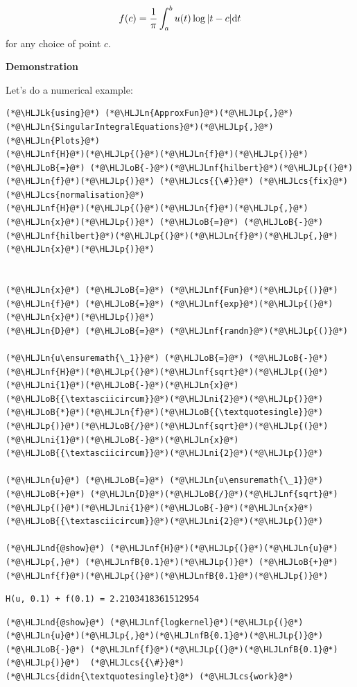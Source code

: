 \documentclass[12pt,a4paper]{article}
\newcommand{\HLJLk}[1]{\textcolor[RGB]{148,91,176}{\textbf{#1}}}
\newcommand{\HLJLn}[1]{#1}
\newcommand{\HLJLnd}[1]{\textcolor[RGB]{214,102,97}{#1}}
\newcommand{\HLJLnf}[1]{\textcolor[RGB]{66,102,213}{#1}}
\newcommand{\HLJLnfB}[1]{\textcolor[RGB]{59,151,46}{#1}}
\newcommand{\HLJLni}[1]{\textcolor[RGB]{59,151,46}{#1}}
\newcommand{\HLJLoB}[1]{\textcolor[RGB]{102,102,102}{\textbf{#1}}}
\newcommand{\HLJLp}[1]{#1}
\newcommand{\HLJLcs}[1]{\textcolor[RGB]{153,153,119}{\textit{#1}}}
\def\D{ {\rm d} }
\def\dt{\D t}
\begin{document}
\[
f(c) = {1 \over \pi} \int_a^b u(t) \log |t-c| \dt
\]
for any choice of point  $c$.

\textbf{Demonstration}

Let's do a numerical example:


\begin{lstlisting}
(*@\HLJLk{using}@*) (*@\HLJLn{ApproxFun}@*)(*@\HLJLp{,}@*) (*@\HLJLn{SingularIntegralEquations}@*)(*@\HLJLp{,}@*) (*@\HLJLn{Plots}@*)
(*@\HLJLnf{H}@*)(*@\HLJLp{(}@*)(*@\HLJLn{f}@*)(*@\HLJLp{)}@*) (*@\HLJLoB{=}@*) (*@\HLJLoB{-}@*)(*@\HLJLnf{hilbert}@*)(*@\HLJLp{(}@*)(*@\HLJLn{f}@*)(*@\HLJLp{)}@*) (*@\HLJLcs{{\#}}@*) (*@\HLJLcs{fix}@*) (*@\HLJLcs{normalisation}@*)
(*@\HLJLnf{H}@*)(*@\HLJLp{(}@*)(*@\HLJLn{f}@*)(*@\HLJLp{,}@*)(*@\HLJLn{x}@*)(*@\HLJLp{)}@*) (*@\HLJLoB{=}@*) (*@\HLJLoB{-}@*)(*@\HLJLnf{hilbert}@*)(*@\HLJLp{(}@*)(*@\HLJLn{f}@*)(*@\HLJLp{,}@*)(*@\HLJLn{x}@*)(*@\HLJLp{)}@*)


(*@\HLJLn{x}@*) (*@\HLJLoB{=}@*) (*@\HLJLnf{Fun}@*)(*@\HLJLp{()}@*)
(*@\HLJLn{f}@*) (*@\HLJLoB{=}@*) (*@\HLJLnf{exp}@*)(*@\HLJLp{(}@*)(*@\HLJLn{x}@*)(*@\HLJLp{)}@*)
(*@\HLJLn{D}@*) (*@\HLJLoB{=}@*) (*@\HLJLnf{randn}@*)(*@\HLJLp{()}@*)

(*@\HLJLn{u\ensuremath{\_1}}@*) (*@\HLJLoB{=}@*) (*@\HLJLoB{-}@*)(*@\HLJLnf{H}@*)(*@\HLJLp{(}@*)(*@\HLJLnf{sqrt}@*)(*@\HLJLp{(}@*)(*@\HLJLni{1}@*)(*@\HLJLoB{-}@*)(*@\HLJLn{x}@*)(*@\HLJLoB{{\textasciicircum}}@*)(*@\HLJLni{2}@*)(*@\HLJLp{)}@*)(*@\HLJLoB{*}@*)(*@\HLJLn{f}@*)(*@\HLJLoB{{\textquotesingle}}@*)(*@\HLJLp{)}@*)(*@\HLJLoB{/}@*)(*@\HLJLnf{sqrt}@*)(*@\HLJLp{(}@*)(*@\HLJLni{1}@*)(*@\HLJLoB{-}@*)(*@\HLJLn{x}@*)(*@\HLJLoB{{\textasciicircum}}@*)(*@\HLJLni{2}@*)(*@\HLJLp{)}@*) 

(*@\HLJLn{u}@*) (*@\HLJLoB{=}@*) (*@\HLJLn{u\ensuremath{\_1}}@*) (*@\HLJLoB{+}@*) (*@\HLJLn{D}@*)(*@\HLJLoB{/}@*)(*@\HLJLnf{sqrt}@*)(*@\HLJLp{(}@*)(*@\HLJLni{1}@*)(*@\HLJLoB{-}@*)(*@\HLJLn{x}@*)(*@\HLJLoB{{\textasciicircum}}@*)(*@\HLJLni{2}@*)(*@\HLJLp{)}@*)

(*@\HLJLnd{@show}@*) (*@\HLJLnf{H}@*)(*@\HLJLp{(}@*)(*@\HLJLn{u}@*)(*@\HLJLp{,}@*) (*@\HLJLnfB{0.1}@*)(*@\HLJLp{)}@*) (*@\HLJLoB{+}@*) (*@\HLJLnf{f}@*)(*@\HLJLp{(}@*)(*@\HLJLnfB{0.1}@*)(*@\HLJLp{)}@*)
\end{lstlisting}

\begin{lstlisting}
H(u, 0.1) + f(0.1) = 2.2103418361512954
\end{lstlisting}


\begin{lstlisting}
(*@\HLJLnd{@show}@*) (*@\HLJLnf{logkernel}@*)(*@\HLJLp{(}@*)(*@\HLJLn{u}@*)(*@\HLJLp{,}@*)(*@\HLJLnfB{0.1}@*)(*@\HLJLp{)}@*) (*@\HLJLoB{-}@*) (*@\HLJLnf{f}@*)(*@\HLJLp{(}@*)(*@\HLJLnfB{0.1}@*)(*@\HLJLp{)}@*)  (*@\HLJLcs{{\#}}@*) (*@\HLJLcs{didn{\textquotesingle}t}@*) (*@\HLJLcs{work}@*)
\end{lstlisting}
\end{document}

